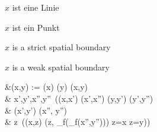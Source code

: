 \begin{enumAx}[D]
                    {$x$ ist eine Linie}
                                
            {$x$ ist ein Punkt} 
            
       {$x$ is a strict spatial boundary}
       
            {$x$ is a weak spatial boundary}
    \end{enumAx}
    
    &\Gonedircomp(x,y) := \GzeroD(x) \wedge \GzeroD(y) \wedge \Gscoinc(x,y) \wedge \mbox{}
        \\ &\hspace{1em}
        \exists x',y',x'',y''\ (\Gsb(x,x') \wedge \Gsb(x',x'') \wedge \Gsb(y,y') \wedge \Gsb(y',y'') \wedge
        \\ &\hspace{2em}
        \neg \Gsov(x',y') \wedge \neg \Gsov(x'', y'') \wedge \mbox{}
        \\ &\hspace{2em}
        \forall z\ (\Gscoinc(x,z) \wedge \Ghypp(z, \Ggrsb_f(\Gsum_f(x'',y''))) \to z=x \vee z=y))
    
